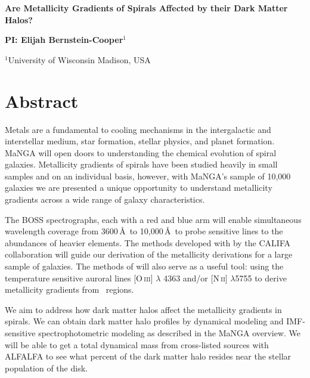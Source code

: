 \documentclass[12pt,a4paper]{article}
\begin{document}
\pagestyle{plain}
 

\begin{center}
{\LARGE{\bf
{Are Metallicity Gradients of Spirals Affected by their Dark Matter Halos?}
}}
\end{center}
\bigskip

\centerline{\bf PI:\@
{Elijah Bernstein-Cooper}$^1$}

\smallskip
$^1$University of Wisconsin Madison, USA
\smallskip


\section{Abstract}\label{sec:abstract}

    Metals are a fundamental to cooling mechanisms in the intergalactic and
    interstellar medium, star formation, stellar physics, and planet
    formation.  MaNGA will open doors to understanding the chemical evolution
    of spiral galaxies. Metallicity gradients of spirals have been studied
    heavily in small samples and on an individual basis, however, with MaNGA's
    sample of 10,000 galaxies we are presented a unique opportunity to
    understand metallicity gradients across a wide range of galaxy
    characteristics.

    The BOSS spectrographs, each with a red and blue arm will enable
    simultaneous wavelength coverage from 3600\,\AA\ to 10,000\,\AA\ to probe
    sensitive lines to the abundances of heavier elements. The methods
    developed with by the CALIFA collaboration \citep{sanchez12} will guide our
    derivation of the metallicity derivations for a large sample of galaxies.
    The methods of \citet{berg13} will also serve as a useful tool: using the
    temperature sensitive auroral lines [O\,\textsc{iii}] $\lambda$ 4363 and/or
    [N\,\textsc{ii}] $\lambda$5755 to derive metallicity gradients from \hii\
    regions.

    We aim to address how dark matter halos affect the metallicity gradients in
    spirals. We can obtain dark matter halo profiles by dynamical modeling
    \citep[e.g.,][]{cappellari06} and IMF-sensitive spectrophotometric modeling
    \citep{conroy12} as described in the MaNGA overview. We will be able to get
    a total dynamical mass from cross-listed sources with ALFALFA
    \citep{haynes11} to see what percent of the dark matter halo resides near
    the stellar population of the disk.
    
\end{document}

